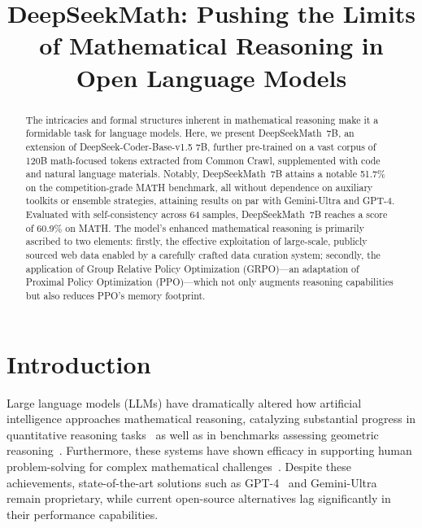 \title{DeepSeekMath: Pushing the Limits of Mathematical Reasoning in Open Language Models}

\begin{abstract}
The intricacies and formal structures inherent in mathematical reasoning make it a formidable task for language models. Here, we present DeepSeekMath~7B, an extension of DeepSeek-Coder-Base-v1.5 7B, further pre-trained on a vast corpus of 120B math-focused tokens extracted from Common Crawl, supplemented with code and natural language materials. Notably, DeepSeekMath~7B attains a notable 51.7\% on the competition-grade MATH benchmark, all without dependence on auxiliary toolkits or ensemble strategies, attaining results on par with Gemini-Ultra and GPT-4. Evaluated with self-consistency across 64 samples, DeepSeekMath~7B reaches a score of 60.9\% on MATH. The model's enhanced mathematical reasoning is primarily ascribed to two elements: firstly, the effective exploitation of large-scale, publicly sourced web data enabled by a carefully crafted data curation system; secondly, the application of Group Relative Policy Optimization (GRPO)—an adaptation of Proximal Policy Optimization (PPO)—which not only augments reasoning capabilities but also reduces PPO's memory footprint.
\end{abstract}

\section{Introduction}

Large language models (LLMs) have dramatically altered how artificial intelligence approaches mathematical reasoning, catalyzing substantial progress in quantitative reasoning tasks~\citep{MATH} as well as in benchmarks assessing geometric reasoning~\citep{trinh2024solving}. Furthermore, these systems have shown efficacy in supporting human problem-solving for complex mathematical challenges~\citep{tao}. Despite these achievements, state-of-the-art solutions such as GPT-4~\citep{gpt4} and Gemini-Ultra~\citep{gemini} remain proprietary, while current open-source alternatives lag significantly in their performance capabilities.

